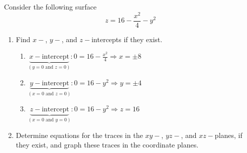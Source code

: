 \documentclass[letter,11pt]{article}
\begin{document}
\subsubsection{}
Consider the following surface $$z=16-\frac{x^2}{4}-y^2$$
\begin{enumerate}[label=\Alph*.]
	\item Find $x-$, $y-$, and $z-$intercepts if they exist.
	      \begin{enumerate}
	      	\item $\underbrace{x-\text{intercept}}_{(y=0 \text{ and } z=0)}:  0 = 16-\frac{x^2}{4} \Longrightarrow x= \pm 8$
	      	\item $\underbrace{y-\text{intercept}}_{(x=0 \text{ and } z=0)}:  0 = 16-y^2 \Longrightarrow y= \pm 4$
	      	\item $\underbrace{z-\text{intercept}}_{(x=0 \text{ and } y=0)}:  0 = 16-y^2 \Longrightarrow z= 16$
	      \end{enumerate}
	\item Determine equations for the traces in the $xy-$, $yz-$, and $xz-$planes, if they exist, and graph these traces in the coordinate planes.
	      	      

\end{enumerate}
\end{document}
